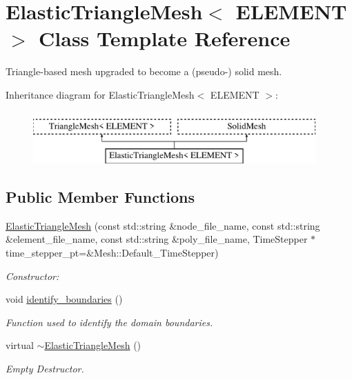 \hypertarget{classElasticTriangleMesh}{}\section{Elastic\+Triangle\+Mesh$<$ E\+L\+E\+M\+E\+NT $>$ Class Template Reference}
\label{classElasticTriangleMesh}


Triangle-\/based mesh upgraded to become a (pseudo-\/) solid mesh.  


Inheritance diagram for Elastic\+Triangle\+Mesh$<$ E\+L\+E\+M\+E\+NT $>$\+:\begin{figure}[H]
\begin{center}
\leavevmode
\includegraphics[height=2.000000cm]{classElasticTriangleMesh}
\end{center}
\end{figure}
\subsection*{Public Member Functions}
\begin{DoxyCompactItemize}
\item 
\hyperlink{classElasticTriangleMesh_a4c24e9abbde344d34e1e08fb3319d7b6}{Elastic\+Triangle\+Mesh} (const std\+::string \&node\+\_\+file\+\_\+name, const std\+::string \&element\+\_\+file\+\_\+name, const std\+::string \&poly\+\_\+file\+\_\+name, Time\+Stepper $\ast$time\+\_\+stepper\+\_\+pt=\&Mesh\+::\+Default\+\_\+\+Time\+Stepper)
\begin{DoxyCompactList}\small\item\em Constructor\+: \end{DoxyCompactList}\item 
void \hyperlink{classElasticTriangleMesh_aa83cad3dfdd980f95bf0dab6fd97bf22}{identify\+\_\+boundaries} ()
\begin{DoxyCompactList}\small\item\em Function used to identify the domain boundaries. \end{DoxyCompactList}\item 
virtual \hyperlink{classElasticTriangleMesh_ade80b912f1bb791e5f4fac35abf90504}{$\sim$\+Elastic\+Triangle\+Mesh} ()
\begin{DoxyCompactList}\small\item\em Empty Destructor. \end{DoxyCompactList}\end{DoxyCompactItemize}


